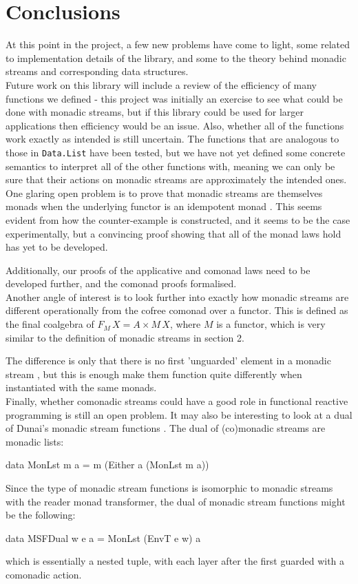 \section{Conclusions}

At this point in the project, a few new problems have come to light, some related to implementation details of the library, and some to the theory behind monadic streams and corresponding data structures. \\

Future work on this library will include a review of the efficiency of many functions we defined - this project was initially an exercise to see what could be done with monadic streams, but if this library could be used for larger applications then efficiency would be an issue. Also, whether all of the functions work exactly as intended is still uncertain. The functions that are analogous to those in \verb+Data.List+ have been tested, but we have not yet defined some concrete semantics to interpret all of the other functions with, meaning we can only be sure that their actions on monadic streams are approximately the intended ones. \\

One glaring open problem is to prove that monadic streams are themselves monads when the underlying functor is an idempotent monad \cite{idempotent_monads}. This seems evident from how the counter-example is constructed, and it seems to be the case experimentally, but a convincing proof showing that all of the monad laws hold has yet to be developed. 

Additionally, our proofs of the applicative and comonad laws need to be developed further, and the comonad proofs formalised. \\

Another angle of interest is to look further into exactly how monadic streams are different operationally from the cofree comonad over a functor. This is defined as the final coalgebra of $F_M\,X = A \times M\,X$, where $M$ is a functor, which is very similar to the definition of monadic streams in section 2.

The difference is only that there is no first 'unguarded' element in a monadic stream , but this is enough make them function quite differently when instantiated with the same monads. \\

Finally, whether comonadic streams could have a good role in functional reactive programming is still an open problem. It may also be interesting to look at a dual of Dunai's monadic stream functions \cite{dunai}. The dual of (co)monadic streams are monadic lists:
\begin{haskell}
data MonLst m a = m (Either a (MonLst m a)) 
\end{haskell}
Since the type of monadic stream functions is isomorphic to monadic streams with the reader monad transformer, the dual of monadic stream functions might be the following:
\begin{haskell}
data MSFDual w e a = MonLst (EnvT e w) a
\end{haskell}
which is essentially a nested tuple, with each layer after the first guarded with a comonadic action. 

